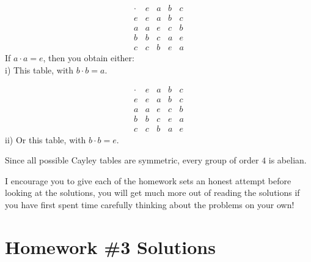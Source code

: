 \begin{enumerate}
    \begin{center}
        \begin{minipage}{0.45\textwidth}
            \centering
            \[
            \begin{array}{c||cccc}
                \cdot & e & a & b & c \\
                \hline \hline
                e & e & a & b & c \\
                a & a & e & c & b \\
                b & b & c & a & e \\
                c & c & b & e & a
            \end{array}
            \]
            If $a \cdot a = e$, then you obtain either:\\
            i) This table, with $b \cdot b = a$.
        \end{minipage}
        \hfill
        \begin{minipage}{0.45\textwidth}
            \centering
            \[
            \begin{array}{c||cccc}
                \cdot & e & a & b & c \\
                \hline \hline
                e & e & a & b & c \\
                a & a & e & c & b \\
                b & b & c & e & a \\
                c & c & b & a & e
            \end{array}
            \]
            ii) Or this table, with $b \cdot b = e$.
        \end{minipage}
    \end{center}

    Since all possible Cayley tables are symmetric, every group of order $4$ is abelian.
\end{enumerate}

\newpage
\begin{tcolorbox}
    I encourage you to give each of the homework sets an honest attempt before looking at the solutions, you will get much more out of reading the solutions if you have first spent time carefully thinking about the problems on your own!
\end{tcolorbox}
\vspace{-0.2in}
\section{Homework \#3 Solutions}

